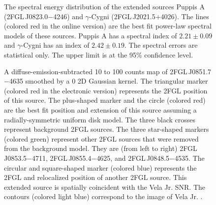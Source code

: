 \documentclass[12pt,preprint]{aastex}
\newif\ifcolorfigure
\newcommand{\gev}{\text{GeV}\xspace}
\newcommand{\tev}{\text{TeV}\xspace}
\begin{document}
\clearpage
\begin{figure}
    \ifcolorfigure
      \plotone{summary_plots/snr_seds_color.eps}
    \else
    \fi
    \caption{
    The spectral energy distribution of the extended sources 
    Puppis A (2FGL\,J0823.0$-$4246) and $\gamma$-Cygni 
    (2FGL\,J2021.5+4026).
    The lines (colored red in the online version)
    are the best fit power-law spectral models of
    these sources. Puppis A has a spectral index of
    $2.21\pm0.09$ and $\gamma$-Cygni has an
    index of $2.42\pm0.19$.
    The spectral errors are statistical only.
    The upper limit is at the 95\% confidence level.
    }
    \label{snr_seds}
  \end{figure}




\begin{figure}
    \ifcolorfigure
      \plotone{source_plots/source_Vela_Jr_color.eps}
    \else
    \fi
  \caption{A diffuse-emission-subtracted 10 \gev to 100 \gev counts map of
  2FGL\,J0851.7$-$4635 smoothed by a 0 2D Gaussian
  kernel. The triangular marker (colored red in the electronic version)
  represents the 2FGL position of this source.  The plus-shaped marker
  and the circle (colored red) are the best fit position and extension of
  this source assuming a radially-symmetric uniform disk model.
  The three black crosses represent background 2FGL sources.
  The three star-shaped markers (colored green) represent other 2FGL sources
  that were removed from the background model.
  They are (from left to right) 2FGL\,J0853.5$-$4711, 2FGL\,J0855.4$-$4625, and 
  2FGL\,J0848.5$-$4535.
  The circular and square-shaped
  marker (colored blue) represents the 2FGL and relocalized position of another 2FGL source.  
  This extended source is spatially
  coincident with the Vela Jr. SNR.  The contours (colored light blue)
  correspond to the \tev image of Vela Jr.
  \citep{vela_jr_hess}.
  }\label{Vela_Jr}
\end{figure}
\end{document}
